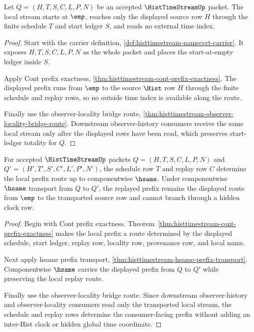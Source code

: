 \begin{theorem}
\label{thm:histtimestream-start-ledger-totality}
Let $Q=(H,T,S,C,L,P,N)$ be an accepted $\HistTimeStreamUp$ packet. The local stream starts at $\emp$, reaches only the displayed source row $H$ through the finite schedule $T$ and start ledger $S$, and reads no external time index.
\end{theorem}
\begin{proof}
Start with the carrier definition, \autoref{def:histtimestream-namecert-carrier}. It exposes $H,T,S,C,L,P,N$ as the whole packet and places the start-at-empty ledger inside $S$.

Apply Cont prefix exactness, \autoref{thm:histtimestream-cont-prefix-exactness}. The displayed prefix runs from $\emp$ to the source $\Hist$ row $H$ through the finite schedule and replay rows, so no outside time index is available along the route.

Finally use the observer-locality bridge route, \autoref{thm:histtimestream-observer-locality-bridge-route}. Downstream observer-history consumers receive the same local stream only after the displayed rows have been read, which preserves start-ledger totality for $Q$.
\end{proof}

\begin{theorem}
\label{thm:histtimestream-cont-replay-determinacy}
For accepted $\HistTimeStreamUp$ packets $Q=(H,T,S,C,L,P,N)$ and $Q'=(H',T',S',C',L',P',N')$, the schedule row $T$ and replay row $C$ determine the local prefix route up to componentwise $\hsame$. Under componentwise $\hsame$ transport from $Q$ to $Q'$, the replayed prefix remains the displayed route from $\emp$ to the transported source row and cannot branch through a hidden clock row.
\end{theorem}
\begin{proof}
Begin with Cont prefix exactness. Theorem~\ref{thm:histtimestream-cont-prefix-exactness} makes the local prefix a route determined by the displayed schedule, start ledger, replay row, locality row, provenance row, and local name.

Next apply hsame prefix transport, \autoref{thm:histtimestream-hsame-prefix-transport}. Componentwise $\hsame$ carries the displayed prefix from $Q$ to $Q'$ while preserving the local replay route.

Finally use the observer-locality bridge route. Since downstream observer-history and observer-locality consumers read only the transported local stream, the schedule and replay rows determine the consumer-facing prefix without adding an inter-Hist clock or hidden global time coordinate.
\end{proof}

